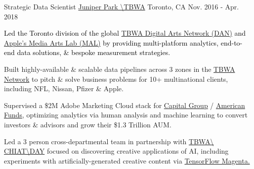 \begin{cventries}
	\cventry
	{Strategic Data Scientist} %
	{\href{https://www.juniperparktbwa.com/}{Juniper Park \textbackslash  TBWA}} %
	{Toronto, CA} %
	{Nov. 2016 - Apr. 2018} %
	{
		\textcolor{black}{Led the Toronto division of the global \href{https://www.digitalartsnetwork.com/}{TBWA Digital Arts Network (DAN)} and \href{https://www.mediaartslab.com/}{Apple's Media Arts Lab (MAL)} by providing multi-platform analytics, end-to-end data solutions, \& bespoke measurement strategies.}
		\textcolor{text}{
			\begin{cvitems} %
				\item {Built highly-available \& scalable data pipelines across 3 zones in the
				  \href{https://tbwa.com/}{TBWA Network} to pitch \& solve
				  business problems for 10+ multinational clients, including NFL, Nissan, Pfizer \& Apple.}
				\item {Supervised a \$2M Adobe Marketing Cloud stack for \href{https://www.capitalgroup.com/}{Capital Group} / \href{https://www.capitalgroup.com/advisor/}{American Funds}, optimizing analytics via human analysis and machine learning to convert investors \& advisors and grow their \$1.3 Trillion AUM.}
				\item {Led a 3 person cross-departmental team in partnership
				  with \href{http://tbwachiatday.com/}{TBWA\textbackslash
					CHIAT\textbackslash DAY} focused on discovering creative
				  applications of AI, including experiments with artificially-generated creative content via \href{https://magenta.tensorflow.org}{TensorFlow Magenta.}}
			\end{cvitems}
		}
	}


\end{cventries}
